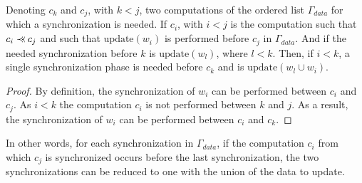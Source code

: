 \begin{myprop}
Denoting $c_k$ and $c_j$, with $k<j$, two computations of the ordered list $\Gamma_{data}$ for which a synchronization is needed. If $c_i$, with $i<j$ is the computation such that $c_i \pprec c_j$ and such that $\text{update}(w_i)$ is performed before $c_j$ in $\Gamma_{data}$. And if the needed synchronization before $k$ is $\text{update}(w_l)$, where $l<k$. Then, if $i<k$, a single synchronization phase is needed before $c_k$ and is $\text{update}(w_l\cup w_i)$.
\end{myprop}

\begin{proof}
By definition, the synchronization of $w_i$ can be performed between $c_i$ and $c_j$. As $i<k$ the computation $c_i$ is not performed between $k$ and $j$. As a result, the synchronization of $w_i$ can be performed between $c_i$ and $c_k$.
\end{proof}

In other words, for each synchronization in $\Gamma_{data}$, if the computation $c_i$ from which $c_j$ is synchronized occurs before the last synchronization, the two synchronizations can be reduced to one with the union of the data to update.



